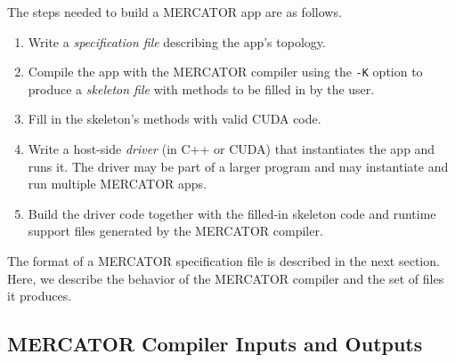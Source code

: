 \documentclass[11pt]{article}
\begin{document}
The steps needed to build a MERCATOR app are as follows.
\begin{enumerate}
\item Write a \emph{specification file} describing the app's topology.

\item Compile the app with the MERCATOR compiler using the \texttt{-K}
  option to produce a \emph{skeleton file} with methods to be filled
  in by the user.

\item Fill in the skeleton's methods with valid CUDA code.

\item Write a host-side \emph{driver} (in C++ or CUDA) that
  instantiates the app and runs it.  The driver may be part of
  a larger program and may instantiate and run multiple MERCATOR
  apps.

\item Build the driver code together with the filled-in skeleton
  code and runtime support files generated by the MERCATOR compiler.

\end{enumerate}
The format of a MERCATOR specification file is described in the next
section.  Here, we describe the behavior of the MERCATOR
compiler and the set of files it produces.

\subsection{MERCATOR Compiler Inputs and Outputs}
\end{document}
